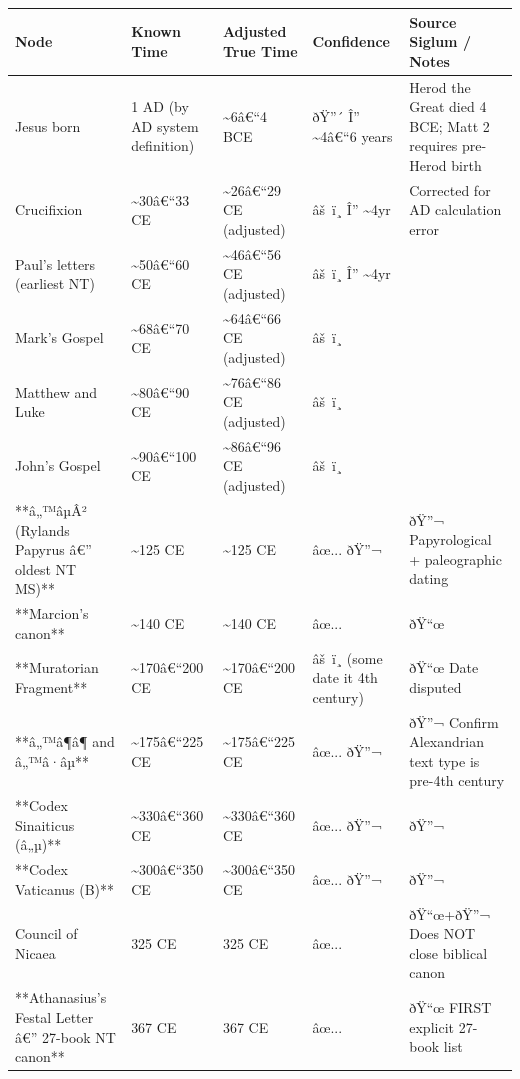 \documentclass[aps,prd,11pt,onecolumn,superscriptaddress,nofootinbib,floatfix]{revtex4-2}
\begin{document}
\begin{table}[h!]
\centering
\begin{tabular}{p{3cm}p{3cm}p{3cm}p{3cm}p{3cm}}
\hline
Node & Known Time & Adjusted True Time & Confidence & Source Siglum / Notes \\
\hline
Jesus born & 1 AD (by AD system definition) & \textasciitilde{}6â€``4 BCE & ðŸ''´ Î'' \textasciitilde{}4â€``6 years & Herod the Great died 4 BCE; Matt 2 requires pre-Herod birth \\
Crucifixion & \textasciitilde{}30â€``33 CE & \textasciitilde{}26â€``29 CE (adjusted) & âš ï¸ Î'' \textasciitilde{}4yr & Corrected for AD calculation error \\
Paul's letters (earliest NT) & \textasciitilde{}50â€``60 CE & \textasciitilde{}46â€``56 CE (adjusted) & âš ï¸ Î'' \textasciitilde{}4yr &  \\
Mark's Gospel & \textasciitilde{}68â€``70 CE & \textasciitilde{}64â€``66 CE (adjusted) & âš ï¸ &  \\
Matthew and Luke & \textasciitilde{}80â€``90 CE & \textasciitilde{}76â€``86 CE (adjusted) & âš ï¸ &  \\
John's Gospel & \textasciitilde{}90â€``100 CE & \textasciitilde{}86â€``96 CE (adjusted) & âš ï¸ &  \\
**â„™âµÂ² (Rylands Papyrus â€'' oldest NT MS)** & \textasciitilde{}125 CE & \textasciitilde{}125 CE & âœ... ðŸ''¬ & ðŸ''¬ Papyrological + paleographic dating \\
**Marcion's canon** & \textasciitilde{}140 CE & \textasciitilde{}140 CE & âœ... & ðŸ``œ \\
**Muratorian Fragment** & \textasciitilde{}170â€``200 CE & \textasciitilde{}170â€``200 CE & âš ï¸ (some date it 4th century) & ðŸ``œ Date disputed \\
**â„™â¶â¶ and â„™â·âµ** & \textasciitilde{}175â€``225 CE & \textasciitilde{}175â€``225 CE & âœ... ðŸ''¬ & ðŸ''¬ Confirm Alexandrian text type is pre-4th century \\
**Codex Sinaiticus (â„µ)** & \textasciitilde{}330â€``360 CE & \textasciitilde{}330â€``360 CE & âœ... ðŸ''¬ & ðŸ''¬ \\
**Codex Vaticanus (B)** & \textasciitilde{}300â€``350 CE & \textasciitilde{}300â€``350 CE & âœ... ðŸ''¬ & ðŸ''¬ \\
Council of Nicaea & 325 CE & 325 CE & âœ... & ðŸ``œ+ðŸ''¬ Does NOT close biblical canon \\
**Athanasius's Festal Letter â€'' 27-book NT canon** & 367 CE & 367 CE & âœ... & ðŸ``œ FIRST explicit 27-book list \\

\end{tabular}
\end{table}
\end{document}
